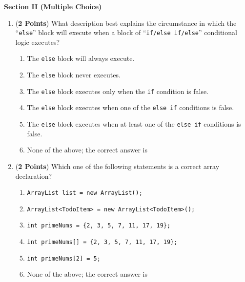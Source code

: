 \documentclass[12pt]{article}
\begin{document}
\newpage

\noindent
{\bf Section II (Multiple Choice)}

\begin{enumerate}

  \item ({\bf 2 Points}) What description best explains the circumstance in which the ``{\tt else}''
    block will execute when a block of ``{\tt if/else if/else}'' conditional logic executes?

\begin{enumerate}
  \item The {\tt else} block will always execute.

\medskip
\item The {\tt else} block never executes.

\medskip
\item The {\tt else} block executes only when the {\tt if} condition is false.

\medskip 
\item The {\tt else} block executes when one of the {\tt else if} conditions is false.

\medskip 
\item The {\tt else} block executes when at least one of the {\tt else if} conditions is false.

\medskip
\item None of the above; the correct answer is \underline{\hspace{3in}}
\end{enumerate}

\vspace*{1in}

\item ({\bf 2 Points})
  Which one of the following statements is a correct array declaration?

  \begin{enumerate}
    \item {\tt ArrayList list = new ArrayList();}
      \medskip 
    \item {\tt ArrayList<TodoItem> = new ArrayList<TodoItem>();}
      \medskip
    \item {\tt int primeNums = \{2, 3, 5, 7, 11, 17, 19\};}
      \medskip 
    \item {\tt int primeNums[] = \{2, 3, 5, 7, 11, 17, 19\};}
      \medskip
    \item {\tt int primeNums[2] = 5;}
      \medskip
\item None of the above; the correct answer is \underline{\hspace{3in}}
  \end{enumerate}


\end{enumerate}
\end{document}

